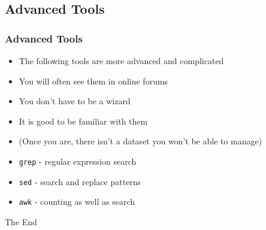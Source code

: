 \documentclass[14pt]{beamer}
\begin{document}
\subsection{Advanced Tools}

\begin{frame}
\frametitle{Advanced Tools}
\begin{itemize}
	\item The following tools are more advanced and complicated
	\item You will often see them in online forums
	\item You don't have to be a wizard
	\item It is good to be familiar with them
	\scriptsize
	\item[] (Once you are, there isn't a dataset you won't be able to manage)
	\normalsize
	\item \texttt{grep} - regular expression search
	\item \texttt{sed} - search and replace patterns
	\item \texttt{awk} - counting as well as search
\end{itemize}
\end{frame}


\begin{frame}
\Huge{\centerline{The End}}
\end{frame}

\end{document}
